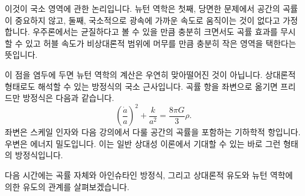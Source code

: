이것이 국소 영역에 관한 논리입니다. 뉴턴 역학은 첫째, 당면한 문제에서 공간의 곡률이 중요하지 않고, 둘째, 국소적으로 광속에 가까운 속도로 움직이는 것이 없다고 가정합니다. 우주론에서는 균질하다고 볼 수 있을 만큼 충분히 크면서도 곡률 효과를 무시할 수 있고 허블 속도가 비상대론적 범위에 머무를 만큼 충분히 작은 영역을 택한다는 뜻입니다.

이 점을 염두에 두면 뉴턴 역학의 계산은 우연히 맞아떨어진 것이 아닙니다. 상대론적 형태로도 해석할 수 있는 방정식의 국소 근사입니다. 곡률 항을 좌변으로 옮기면 프리드만 방정식은 다음과 같습니다.
\begin{equation}
\left(\frac{\dot a}{a}\right)^2+\frac{k}{a^2}=\frac{8\pi G}{3}\rho.
\end{equation}
좌변은 스케일 인자와 다음 강의에서 다룰 공간의 곡률을 포함하는 기하학적 항입니다. 우변은 에너지 밀도입니다. 이는 일반 상대성 이론에서 기대할 수 있는 바로 그런 형태의 방정식입니다.

다음 시간에는 곡률 자체와 아인슈타인 방정식, 그리고 상대론적 유도와 뉴턴 역학에 의한 유도의 관계를 살펴보겠습니다.
